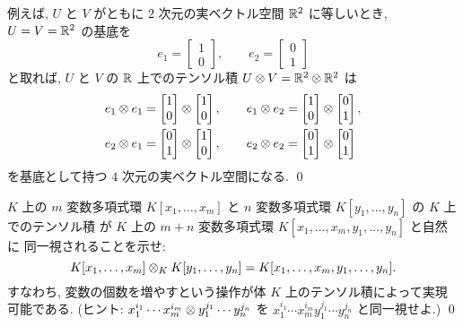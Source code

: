 \documentclass[12pt,twoside]{jarticle}
\begin{document}
\begin{example}
  例えば, $U$ と $V$ がともに $2$ 次元の実ベクトル空間 ${\mathbb R}^2$ に等しいとき,
  $U = V = {\mathbb R}^2$ の基底を
  \begin{equation*}
    e_1=\begin{bmatrix}1\\0\end{bmatrix}, \qquad
    e_2=\begin{bmatrix}0\\1\end{bmatrix}
  \end{equation*}
  と取れば,
  $U$ と $V$ の ${\mathbb R}$ 上でのテンソル積 $U\otimes V={\mathbb R}^2\otimes {\mathbb R}^2$ は %
  \begin{align*}
    &
    e_1\otimes e_1 = 
    \begin{bmatrix}1\\0\end{bmatrix}\otimes\begin{bmatrix}1\\0\end{bmatrix},
    \qquad
    e_1\otimes e_2 = 
    \begin{bmatrix}1\\0\end{bmatrix}\otimes\begin{bmatrix}0\\1\end{bmatrix},
    \\ &
    e_2\otimes e_1 = 
    \begin{bmatrix}0\\1\end{bmatrix}\otimes\begin{bmatrix}1\\0\end{bmatrix},
    \qquad
    e_2\otimes e_2 = 
    \begin{bmatrix}0\\1\end{bmatrix}\otimes\begin{bmatrix}0\\1\end{bmatrix}
  \end{align*}
  を基底として持つ $4$ 次元の実ベクトル空間になる.
  \qed
\end{example}

\begin{question}
  $K$ 上の $m$ 変数多項式環 $K[x_1,\ldots,x_m]$ 
  と $n$ 変数多項式環 $K[y_1,\ldots,y_n]$ の $K$ 上でのテンソル積
  が $K$ 上の $m+n$ 変数多項式環 $K[x_1,\ldots,x_m,y_1,\ldots,y_n]$ と自然に
  同一視されることを示せ:
  \begin{equation*}
    K[x_1,\ldots,x_m]\otimes_K K[y_1,\ldots,y_n]
    = K[x_1,\ldots,x_m,y_1,\ldots,y_n].
  \end{equation*}
  すなわち, 変数の個数を増やすという操作が体 $K$ 上のテンソル積によって実現
  可能である. 
  (ヒント: $x_1^{i_1}\cdots x_m^{i_m}\otimes y_1^{j_1}\cdots y_n^{j_n}$ 
  を $x_1^{i_1}\cdots x_m^{i_m}y_1^{j_1}\cdots y_n^{j_n}$ と同一視せよ.)
  \qed
\end{question}
\end{document}
